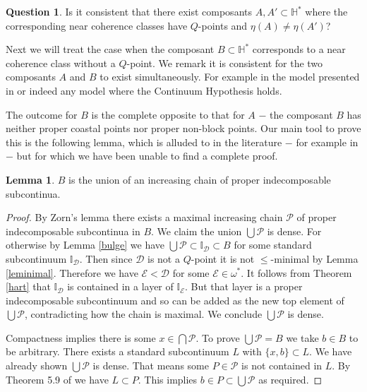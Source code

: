 \documentclass[12pt]{article}
\theoremstyle{plain}
\theoremstyle{definition}
\newtheorem{lemma}[theorem]{Lemma}
\newcounter{claim5counter}
\newtheorem{question}[theorem]{Question}
\newcommand{\W}{\ensuremath{\omega}}
\newcommand{\II}{\ensuremath{\mathbb I}}
\newcommand{\HH}{\ensuremath{\mathbb H}}
\newcommand{\0}{\ensuremath{\varnothing}}
\newcommand{\cD}{\ensuremath{\mathcal D}}
\newcommand{\cP}{\ensuremath{\mathcal P}}
\newcommand{\cE}{\ensuremath{\mathcal E}}
\begin{document}
	\begin{question}
		Is it consistent that there exist composants $A,A' \subset \HH^*$ where the corresponding near coherence classes have $Q$-points and $\eta(A) \ne \eta(A')$?
	\end{question}
	
	
	Next we will treat the case when the composant $B \subset \HH^*$ corresponds to a near coherence class without a $Q$-point. 
	We remark it is consistent for the two composants $A$ and $B$ to exist simultaneously. For example in the model presented in \cite{FmNCC}
	or indeed any model where the Continuum Hypothesis holds.
	
	
	The outcome for $B$ is the complete opposite to that for $A$ $-$ the composant $B$ has neither proper coastal points nor proper non-block points. Our main tool to prove this is the following lemma, which is alluded to in the literature $-$ for example in \cite{RBOrder} $-$ but for which we have been unable to find a complete proof.
	
	\begin{lemma} \label{chain}
		$B$ is the union of an increasing chain of proper indecomposable subcontinua.
	\end{lemma}
	
	\begin{proof}
		By Zorn's lemma there exists a maximal increasing chain $\cP$ of proper indecomposable subcontinua in $B$. 
		We claim the union $\bigcup \cP$ is dense. For otherwise by Lemma \ref{bulge} we have 
		$\bigcup \cP \subset \II_\cD \subset B$ for some standard subcontinuum $ \II_\cD$. 
		Then since $\cD$ is not a $Q$-point it is not $\le$-minimal by Lemma \ref{leminimal}. 
		Therefore we have $\cE < \cD$ for some $\cE \in \W^*$. 
		It follows from Theorem \ref{hart} that $\II_\cD$ is contained in a layer of $\II_\cE$. 
		But that layer is a proper indecomposable subcontinuum and so can be added as the new top element of 
		$\bigcup \cP$, contradicting how the chain is maximal. We conclude $\bigcup \cP$ is dense.
		
		Compactness implies there is some $x \in \bigcap \cP$. To prove $\bigcup \cP = B$ we take \mbox{$b \in B$} to be arbitrary.
		There exists a standard subcontinuum $L$ with $\{x,b\} \subset L$. We have already shown $\bigcup \cP$ is dense.
		That means some $P \in \cP$ is not contained in $L$. By Theorem 5.9 of \cite{CS1} we have $L \subset P$.
		This implies $b \in P \subset \bigcup \cP$ as required.\end{proof}
	
\end{document}
